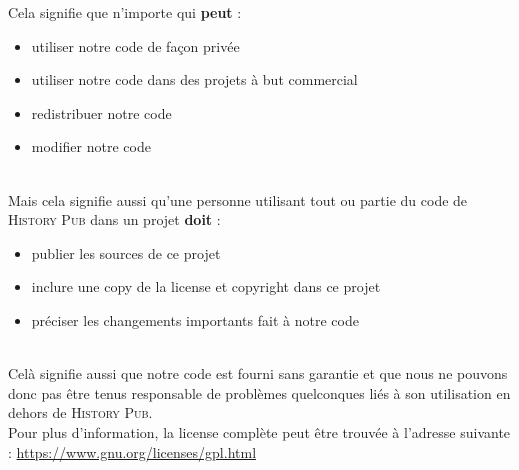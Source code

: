 \documentclass[11pt]{scrreprt}
\begin{document}
    \noindent Cela signifie que n'importe qui \textbf{peut} :
    \begin{itemize}
        \item utiliser notre code de façon privée
        \item utiliser notre code dans des projets à but commercial
        \item redistribuer notre code
        \item modifier notre code
    \end{itemize}
    \hfill\\
    Mais cela signifie aussi qu'une personne utilisant tout ou partie du code de \textsc{History Pub} dans un projet \textbf{doit} :
    \begin{itemize}
        \item publier les sources de ce projet
        \item inclure une copy de la license et copyright dans ce projet
        \item préciser les changements importants fait à notre code
    \end{itemize}
    \hfill\\
    Celà signifie aussi que notre code est fourni sans garantie et que nous ne pouvons donc pas être tenus responsable de problèmes quelconques liés à son utilisation en dehors de \textsc{History Pub}.
    \hfill\\

    \noindent Pour plus d'information, la license complète peut être trouvée à l'adresse suivante : \url{https://www.gnu.org/licenses/gpl.html}
\end{document}
